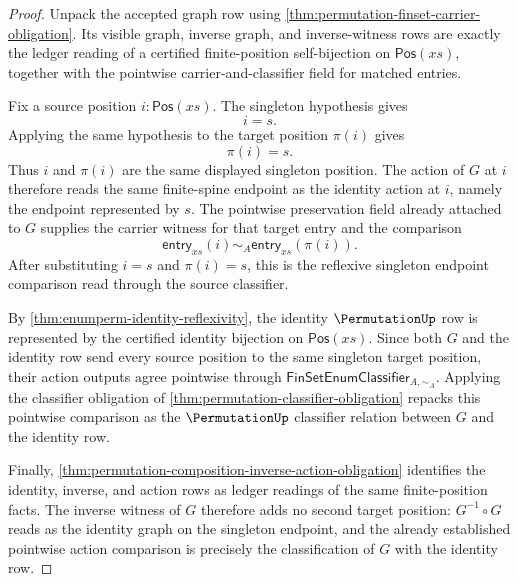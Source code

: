 \begin{proof}
Unpack the accepted graph row using \autoref{thm:permutation-finset-carrier-obligation}. Its visible graph, inverse graph, and inverse-witness rows are exactly the ledger reading of a certified finite-position self-bijection on $\mathsf{Pos}(xs)$, together with the pointwise carrier-and-classifier field for matched entries.

Fix a source position $i:\mathsf{Pos}(xs)$. The singleton hypothesis gives
$$
i=s.
$$
Applying the same hypothesis to the target position $\pi(i)$ gives
$$
\pi(i)=s.
$$
Thus $i$ and $\pi(i)$ are the same displayed singleton position. The action of $G$ at $i$ therefore reads the same finite-spine endpoint as the identity action at $i$, namely the endpoint represented by $s$. The pointwise preservation field already attached to $G$ supplies the carrier witness for that target entry and the comparison
$$
\mathsf{entry}_{xs}(i)\sim_A\mathsf{entry}_{xs}(\pi(i)).
$$
After substituting $i=s$ and $\pi(i)=s$, this is the reflexive singleton endpoint comparison read through the source classifier.

By \autoref{thm:enumperm-identity-reflexivity}, the identity $\PermutationUp$ row is represented by the certified identity bijection on $\mathsf{Pos}(xs)$. Since both $G$ and the identity row send every source position to the same singleton target position, their action outputs agree pointwise through $\mathsf{FinSetEnumClassifier}_{A,\sim_A}$. Applying the classifier obligation of \autoref{thm:permutation-classifier-obligation} repacks this pointwise comparison as the $\PermutationUp$ classifier relation between $G$ and the identity row.

Finally, \autoref{thm:permutation-composition-inverse-action-obligation} identifies the identity, inverse, and action rows as ledger readings of the same finite-position facts. The inverse witness of $G$ therefore adds no second target position: $G^{-1}\circ G$ reads as the identity graph on the singleton endpoint, and the already established pointwise action comparison is precisely the classification of $G$ with the identity row.
\end{proof}
